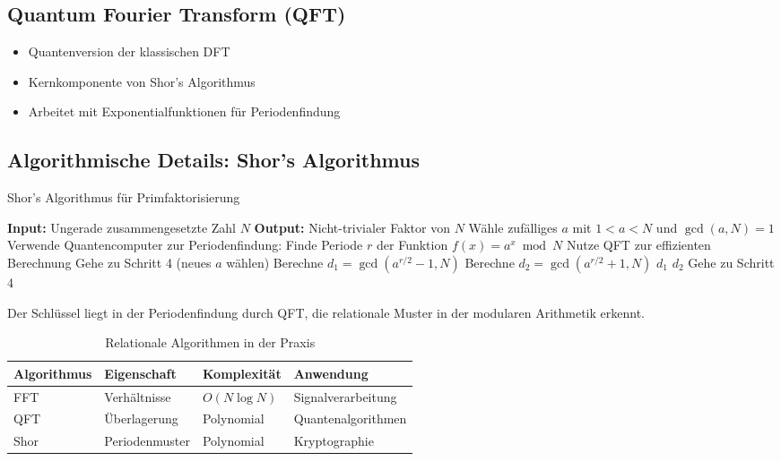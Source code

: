 \documentclass[11pt,a4paper]{article}
\begin{document}
	\subsection{Quantum Fourier Transform (QFT)}
	
	\begin{itemize}
		\item Quantenversion der klassischen DFT
		\item Kernkomponente von Shor's Algorithmus
		\item Arbeitet mit Exponentialfunktionen für Periodenfindung
	\end{itemize}
	
	\subsection{Algorithmische Details: Shor's Algorithmus}
	
	\begin{algorithm}[htbp]
		\caption{Shor's Algorithmus für Primfaktorisierung}
		\label{alg:shor}
		\begin{algorithmic}[1]
			\STATE \textbf{Input:} Ungerade zusammengesetzte Zahl $N$
			\STATE \textbf{Output:} Nicht-trivialer Faktor von $N$
			\STATE 
			\STATE Wähle zufälliges $a$ mit $1 < a < N$ und $\gcd(a,N) = 1$
			\STATE Verwende Quantencomputer zur Periodenfindung:
			\STATE \quad Finde Periode $r$ der Funktion $f(x) = a^x \bmod N$
			\STATE \quad Nutze QFT zur effizienten Berechnung
			\STATE Gehe zu Schritt 4 (neues $a$ wählen)
			\ENDIF
			\STATE Berechne $d_1 = \gcd(a^{r/2} - 1, N)$
			\STATE Berechne $d_2 = \gcd(a^{r/2} + 1, N)$
			\RETURN $d_1$
			\RETURN $d_2$
			\ELSE
			\STATE Gehe zu Schritt 4
			\ENDIF
		\end{algorithmic}
	\end{algorithm}
	
	Der Schlüssel liegt in der Periodenfindung durch QFT, die relationale Muster in der modularen Arithmetik erkennt.
	
	\begin{table}[htbp]
		\centering
		\begin{adjustbox}{width=0.85\textwidth}
			\begin{tabular}{llll}
				\toprule
				\textbf{Algorithmus} & \textbf{Eigenschaft} & \textbf{Komplexität} & \textbf{Anwendung} \\
				\midrule
				FFT & Verhältnisse & $O(N \log N)$ & Signalverarbeitung \\
				QFT & Überlagerung & Polynomial & Quantenalgorithmen \\
				Shor & Periodenmuster & Polynomial & Kryptographie \\
				\bottomrule
			\end{tabular}
		\end{adjustbox}
		\caption{Relationale Algorithmen in der Praxis}
		\label{tab:algorithmen}
	\end{table}
	
\end{document}
